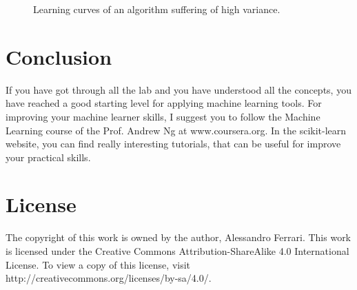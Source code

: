 \documentclass[aps,letterpaper,10pt]{revtex4}
\begin{document}
\begin{figure}[]
  \caption{Learning curves of an algorithm suffering of high variance.}\label{fig:12}
\endminipage
\end{figure}

\section{Conclusion}
If you have got through all the lab and you have understood all the concepts, you have reached a good starting level for applying machine learning tools. For improving your machine learner skills, I suggest you to follow the Machine Learning course of the Prof. Andrew Ng at www.coursera.org. In the scikit-learn website, you can find really interesting tutorials, that can be useful for improve your practical skills.

\section{License}
The copyright of this work is owned by the author, Alessandro Ferrari.
This work is licensed under the Creative Commons Attribution-ShareAlike 4.0 International License. To view a copy of this license, visit http://creativecommons.org/licenses/by-sa/4.0/.
\end{document}
